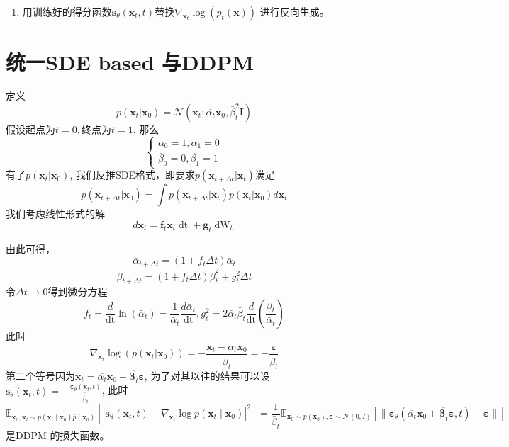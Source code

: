 \documentclass{article}
\newcommand{\nobracket}{}
\newcommand{\tmmathbf}[1]{\ensuremath{\boldsymbol{#1}}}
\newcommand{\tmop}[1]{\ensuremath{\operatorname{#1}}}
\begin{document}
\begin{CJK*}{UTF8}{gbsn}
\begin{enumerate}
  \item 用训练好的得分函数$\tmmathbf{s}_{\theta} (\tmmathbf{x}_t,
  t)$替换$\nabla_{\tmmathbf{x}_t} \log (p_t (\tmmathbf{x}))$
  进行反向生成。
\end{enumerate}

\section{统一SDE based 与DDPM}

定义
\[ p (\tmmathbf{x}_t | \tmmathbf{x}_0 \nobracket) =\mathcal{N} (\tmmathbf{x}_t
   ; \overline{\alpha_t} \tmmathbf{x}_0, \bar{\beta}_t^2 \tmmathbf{I}) \]
假设起点为$t = 0,$终点为$t = 1$, 那么
\[ \left\{ \begin{array}{c}
     \bar{\alpha}_0 = 1, \bar{\alpha}_1 = 0\\
     \bar{\beta}_0 = 0, \overline{\beta_1} = 1
   \end{array} \right. \]
有了$p (\tmmathbf{x}_t | \tmmathbf{x}_0 \nobracket)$,
我们反推SDE格式，即要求$p (\tmmathbf{x}_{t + \Delta t} |
\tmmathbf{x}_t \nobracket)$满足
\[ p (\tmmathbf{x}_{t + \Delta t} | \tmmathbf{x}_0 \nobracket) = \int p
   (\tmmathbf{x}_{t + \Delta t} | \tmmathbf{x}_t \nobracket) p (\tmmathbf{x}_t
   | \tmmathbf{x}_0 \nobracket) d\tmmathbf{x}_t \]
我们考虑线性形式的解
\[ d\tmmathbf{x}_t =\tmmathbf{f}_t \tmmathbf{x}_t \tmop{dt} +\tmmathbf{g}_t
   \tmop{dW}_t \]

由此可得，
\[ \bar{\alpha}_{t + \Delta t} = (1 + f_t \Delta t) \bar{\alpha}_t \]
\[ \bar{\beta}_{t + \Delta t} = (1 + f_t \Delta t) \bar{\beta}_t^2 + g_t^2
   \Delta t \]
令$\Delta t \rightarrow 0$得到微分方程
\[ f_t = \frac{d}{\tmop{dt}} \ln (\bar{\alpha}_t) = \frac{1}{\bar{\alpha}_t}
   \frac{d \bar{\alpha}_t}{\tmop{dt}}, g_t^2 = 2 \bar{\alpha}_t \bar{\beta}_t
   \frac{d}{\tmop{dt}} \left( \frac{\overline{\beta_t}}{\bar{\alpha}_t}
   \right) \]
此时
\[ \nabla_{\tmmathbf{x}_t} \log (p (\tmmathbf{x}_t | \tmmathbf{x}_0
   \nobracket)) = - \frac{\tmmathbf{x}_t - \bar{\alpha}_t
   \tmmathbf{x}_0}{\bar{\beta}_t} = -
   \frac{\tmmathbf{\varepsilon}}{\bar{\beta}_t} \]
第二个等号因为$\tmmathbf{x}_t = \overline{\alpha_t} \tmmathbf{x}_0 +
\overline{\tmmathbf{\beta}_t} \tmmathbf{\varepsilon}$,
为了对其以往的结果可以设$\tmmathbf{s}_{\theta} (\tmmathbf{x}_t, t)
= - \frac{\tmmathbf{\varepsilon}_{\theta} (\tmmathbf{x}_t,
t)}{\bar{\beta}_t}$, 此时
\[ \mathbb{E}_{\tmmathbf{x}_0, \tmmathbf{x}_t \sim p (\tmmathbf{x}_t \mid
   \tmmathbf{x}_0) \bar{p} (\tmmathbf{x}_0)} [|
   \tmmathbf{s}_{\tmmathbf{\theta}} (\tmmathbf{x}_t, t) -
   \nabla_{\tmmathbf{x}_t} \log p (\tmmathbf{x}_t \mid \tmmathbf{x}_0) |^2] =
   \frac{1}{\bar{\beta}_t} \mathbb{E}_{\tmmathbf{x}_0 \sim p (\tmmathbf{x}_0),
   \tmmathbf{\varepsilon} \sim \mathcal{N} (0, I)} [\|
   \tmmathbf{\varepsilon}_{\theta} (\overline{\alpha_t} \tmmathbf{x}_0 +
   \overline{\tmmathbf{\beta}_t} \tmmathbf{\varepsilon}, t)
   -\tmmathbf{\varepsilon} \|] \]
是DDPM 的损失函数。


\end{CJK*}
\end{document}
